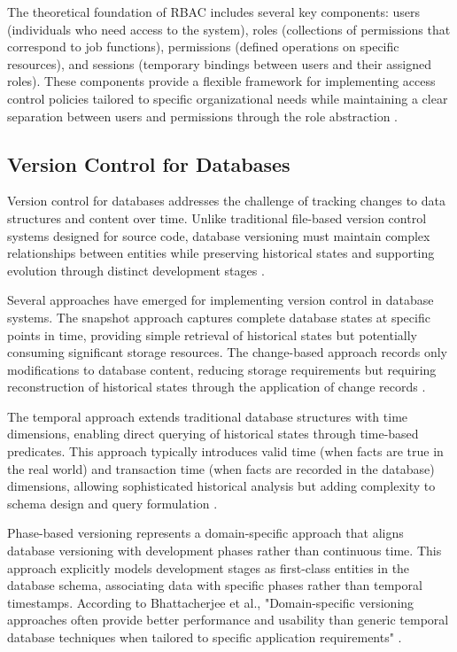 The theoretical foundation of RBAC includes several key components: users (individuals who need access to the system), roles (collections of permissions that correspond to job functions), permissions (defined operations on specific resources), and sessions (temporary bindings between users and their assigned roles). These components provide a flexible framework for implementing access control policies tailored to specific organizational needs while maintaining a clear separation between users and permissions through the role abstraction \cite{sandhu1997arbac97}.


\subsection{Version Control for Databases}
\label{subsec:database-versioning}

Version control for databases addresses the challenge of tracking changes to data structures and content over time. Unlike traditional file-based version control systems designed for source code, database versioning must maintain complex relationships between entities while preserving historical states and supporting evolution through distinct development stages \cite{bhattacherjee2015principles}.

Several approaches have emerged for implementing version control in database systems. The snapshot approach captures complete database states at specific points in time, providing simple retrieval of historical states but potentially consuming significant storage resources. The change-based approach records only modifications to database content, reducing storage requirements but requiring reconstruction of historical states through the application of change records \cite{bhattacherjee2015principles}.

The temporal approach extends traditional database structures with time dimensions, enabling direct querying of historical states through time-based predicates. This approach typically introduces valid time (when facts are true in the real world) and transaction time (when facts are recorded in the database) dimensions, allowing sophisticated historical analysis but adding complexity to schema design and query formulation \cite{snodgrass1999developing}.

Phase-based versioning represents a domain-specific approach that aligns database versioning with development phases rather than continuous time. This approach explicitly models development stages as first-class entities in the database schema, associating data with specific phases rather than temporal timestamps. According to Bhattacherjee et al., "Domain-specific versioning approaches often provide better performance and usability than generic temporal database techniques when tailored to specific application requirements" \cite{bhattacherjee2015principles}.


